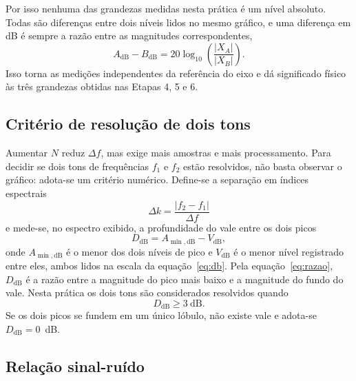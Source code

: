 \documentclass[11pt,a4paper]{article}
\begin{document}
Por isso nenhuma das grandezas medidas nesta prática é um nível absoluto. Todas
são diferenças entre dois níveis lidos no mesmo gráfico, e uma diferença em dB é
sempre a razão entre as magnitudes correspondentes,
\begin{equation}
  A_{\mathrm{dB}} - B_{\mathrm{dB}}
    = 20\log_{10}\!\left(\frac{|X_A|}{|X_B|}\right) .
  \label{eq:razao}
\end{equation}
Isso torna as medições independentes da referência do eixo e dá significado
físico às três grandezas obtidas nas Etapas 4, 5 e 6.

\subsection*{Critério de resolução de dois tons}

Aumentar $N$ reduz $\Delta f$, mas exige mais amostras e mais processamento.
Para decidir se dois tons de frequências $f_1$ e $f_2$ estão resolvidos, não
basta observar o gráfico: adota-se um critério numérico. Define-se a separação
em índices espectrais
\begin{equation}
  \Delta k = \frac{|f_2 - f_1|}{\Delta f}
  \label{eq:dk}
\end{equation}
e mede-se, no espectro exibido, a profundidade do vale entre os dois picos
\begin{equation}
  D_{\mathrm{dB}} = A_{\min,\mathrm{dB}} - V_{\mathrm{dB}} ,
  \label{eq:vale}
\end{equation}
onde $A_{\min,\mathrm{dB}}$ é o menor dos dois níveis de pico e
$V_{\mathrm{dB}}$ é o menor nível registrado entre eles, ambos lidos na escala
da equação~\eqref{eq:db}. Pela equação~\eqref{eq:razao}, $D_{\mathrm{dB}}$ é a
razão entre a magnitude do pico mais baixo e a magnitude do fundo do vale.
Nesta prática os dois tons são considerados resolvidos quando
\begin{equation}
  D_{\mathrm{dB}} \geq 3~\text{dB} .
  \label{eq:criterio}
\end{equation}
Se os dois picos se fundem em um único lóbulo, não existe vale e adota-se
$D_{\mathrm{dB}} = 0$~dB.

\subsection*{Relação sinal-ruído}
\end{document}
